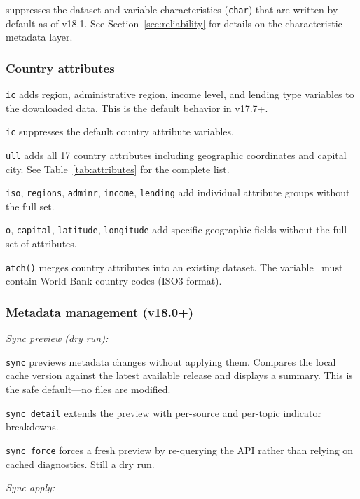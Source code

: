 \documentclass[bib]{statapress}
\begin{document}
\hangpara
\texttt{} suppresses the dataset and variable characteristics
(\texttt{char}) that are written by default as of v18.1. See
Section~\ref{sec:reliability} for details on the characteristic metadata layer.

\subsubsection*{Country attributes}

\hangpara
\texttt{ic} adds region, administrative region, income level, and lending type variables to the downloaded data. This is the default behavior in v17.7+.

\hangpara
\texttt{ic} suppresses the default country attribute variables.

\hangpara
\texttt{ull} adds all 17 country attributes including geographic coordinates and capital city. See Table~\ref{tab:attributes} for the complete list.

\hangpara
\texttt{iso}, \texttt{regions}, \texttt{adminr}, \texttt{income},
\texttt{lending} add individual attribute groups without the full set.

\hangpara
\texttt{o}, \texttt{capital}, \texttt{latitude}, \texttt{longitude} add specific geographic fields without the full set of attributes.

\hangpara
\texttt{atch(\varname)} merges country attributes into an existing dataset. The variable \varname\ must contain World Bank country codes (ISO3 format).

\subsubsection*{Metadata management (v18.0+)}

\noindent\textit{Sync preview (dry run):}

\hangpara
\texttt{sync} previews metadata changes without applying them. Compares the
local cache version against the latest available release and displays a
summary. This is the safe default---no files are modified.

\hangpara
\texttt{sync detail} extends the preview with per-source and per-topic
indicator breakdowns.

\hangpara
\texttt{sync force} forces a fresh preview by re-querying the API rather
than relying on cached diagnostics. Still a dry run.

\noindent\textit{Sync apply:}
\end{document}
